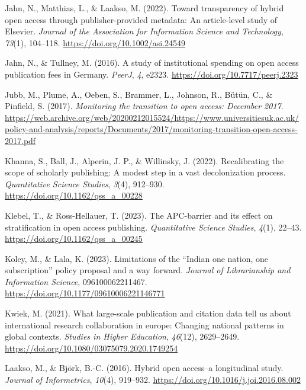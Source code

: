 \documentclass[a4paper,man,floatsintext,longtable,noextraspace,12pt]{apa6}
\newenvironment{CSLReferences}%
  {}%
  {\par}
\begin{document}
\begin{CSLReferences}{1}{0}
\leavevmode{}%
Jahn, N., Matthias, L., \& Laakso, M. (2022). Toward transparency of
hybrid open access through publisher-provided metadata: An article-level
study of {Elsevier}. \emph{Journal of the Association for Information
Science and Technology}, \emph{73}(1), 104--118.
\url{https://doi.org/10.1002/asi.24549}

\leavevmode{}%
Jahn, N., \& Tullney, M. (2016). A study of institutional spending on
open access publication fees in {Germany}. \emph{{PeerJ}}, \emph{4},
e2323. \url{https://doi.org/10.7717/peerj.2323}

\leavevmode{}%
Jubb, M., Plume, A., Oeben, S., Brammer, L., Johnson, R., Bütün, C., \&
Pinfield, S. (2017). \emph{Monitoring the transition to open access:
December 2017}.
\url{https://web.archive.org/web/20200212015524/https://www.universitiesuk.ac.uk/policy-and-analysis/reports/Documents/2017/monitoring-transition-open-access-2017.pdf}

\leavevmode{}%
Khanna, S., Ball, J., Alperin, J. P., \& Willinsky, J. (2022).
Recalibrating the scope of scholarly publishing: A modest step in a vast
decolonization process. \emph{Quantitative Science Studies},
\emph{3}(4), 912--930. \url{https://doi.org/10.1162/qss_a_00228}

\leavevmode{}%
Klebel, T., \& Ross-Hellauer, T. (2023). The APC-barrier and its effect
on stratification in open access publishing. \emph{Quantitative Science
Studies}, \emph{4}(1), 22--43. \url{https://doi.org/10.1162/qss_a_00245}

\leavevmode{}%
Koley, M., \& Lala, K. (2023). Limitations of the {{``Indian one nation,
one subscription''}} policy proposal and a way forward. \emph{Journal of
Librarianship and Information Science}, 096100062211467.
\url{https://doi.org/10.1177/09610006221146771}

\leavevmode{}%
Kwiek, M. (2021). What large-scale publication and citation data tell us
about international research collaboration in europe: Changing national
patterns in global contexts. \emph{Studies in Higher Education},
\emph{46}(12), 2629--2649.
\url{https://doi.org/10.1080/03075079.2020.1749254}

\leavevmode{}%
Laakso, M., \& Björk, B.-C. (2016). Hybrid open access--a longitudinal
study. \emph{Journal of Informetrics}, \emph{10}(4), 919--932.
\url{https://doi.org/10.1016/j.joi.2016.08.002}


\end{CSLReferences}
\end{document}
